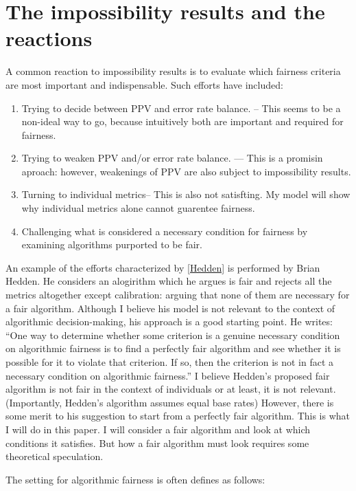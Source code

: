 \documentclass{article}
\begin{document}
\section{The impossibility results and the reactions}

A common reaction to impossibility results is to evaluate which fairness criteria are most important and indispensable. Such efforts have included: 
\begin{enumerate}
    \item Trying to decide between PPV and error rate balance. -- This seems to be a non-ideal way to go, because intuitively both are important and required for fairness. 
     \item Trying to weaken PPV and/or error rate balance. — This is a promisin aproach: however, weakenings of PPV are also subject to impossibility results. 
    \item Turning to individual metrics-- This is also not satisfting. My model will show why individual metrics alone cannot guarentee fairness. 
    \item Challenging what is considered a necessary condition for fairness by examining algorithms purported to be fair. \label{Hedden}
\end{enumerate}

An example of the efforts characterized by \ref{Hedden} is performed by Brian Hedden. He considers an alogirithm which he argues is fair and rejects all the metrics altogether except calibration: arguing that none of them are necessary for a fair algorithm.  Although I believe his model is not relevant to the context of algorithmic decision-making, his approach is a good starting point. He writes: “One way to determine whether some criterion is a genuine necessary condition on algorithmic fairness is to find a perfectly fair algorithm and see whether it is possible for it to violate that criterion. If so, then the criterion is not in fact a necessary condition on algorithmic fairness.” I believe Hedden’s proposed fair algorithm is not fair in the context of individuals or at least, it is not relevant. (Importantly, Hedden’s algorithm assumes equal base rates) However, there is some merit to his suggestion to start from a perfectly fair algorithm. This is what I will do in this paper. I will consider a fair algorithm and look at which conditions it satisfies. But how a fair algorithm must look requires some theoretical speculation.

The setting for algorithmic fairness is often defines as follows:
\end{document}
